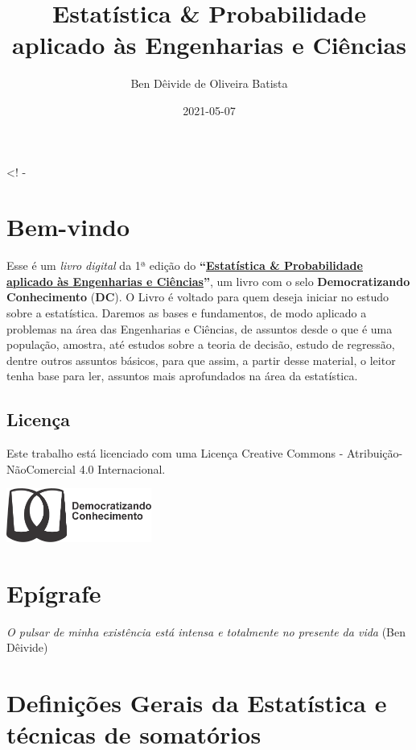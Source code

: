 \documentclass[
]{book}
\title{Estatística \& Probabilidade aplicado às Engenharias e Ciências}
\author{Ben Dêivide de Oliveira Batista}
\date{2021-05-07}
\begin{document}
\maketitle

{
\hypersetup{linkcolor=}
\setcounter{tocdepth}{2}
\tableofcontents
}
\listoftables
\listoffigures
\textless! -

\hypertarget{bem-vindo}{%
\chapter*{Bem-vindo}\label{bem-vindo}}


Esse é um \emph{livro digital} da 1ª edição do \textbf{``\href{}{Estatística \& Probabilidade aplicado às Engenharias e Ciências}''}, um livro com o selo \textbf{Democratizando Conhecimento} (\textbf{DC}). O Livro é voltado para quem deseja iniciar no estudo sobre a estatística. Daremos as bases e fundamentos, de modo aplicado a problemas na área das Engenharias e Ciências, de assuntos desde o que é uma população, amostra, até estudos sobre a teoria de decisão, estudo de regressão, dentre outros assuntos básicos, para que assim, a partir desse material, o leitor tenha base para ler, assuntos mais aprofundados na área da estatística.

\hypertarget{licenuxe7a}{%
\section*{Licença}\label{licenuxe7a}}


Este trabalho está licenciado com uma Licença Creative Commons - Atribuição-NãoComercial 4.0 Internacional.

\includegraphics[width=1.875in,height=\textheight]{Logo-DC-preto2.png}

\hypertarget{epuxedgrafe}{%
\chapter*{Epígrafe}\label{epuxedgrafe}}


\emph{O pulsar de minha existência está intensa e totalmente no presente da vida} (Ben Dêivide)

\hypertarget{dgets}{%
\chapter{Definições Gerais da Estatística e técnicas de somatórios}\label{dgets}}
\end{document}
